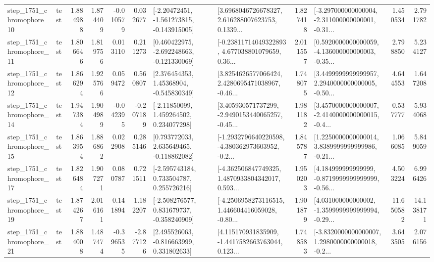 \begin{tabular}{llrrrrllrlrr}
 step\_1751\_chromophore\_10 &      test &      1.884988 &    1.874409 &     -0.010579 &  0.032677 &   [-2.20472451, -1.561273815, -0.143915005] &  [3.6968046726678327, 2.616288007623753, 0.1339... &       1.827418 &  [-3.297000000000004, -2.311000000000001, -0.31... &            1.450534 &          2.791782 \\
 step\_1751\_chromophore\_11 &      test &      1.806646 &    1.819756 &      0.013110 &  0.211273 &   [0.460422975, -2.692248663, -0.121330069] &  [-0.23811714049322893, 4.677038801079659, 0.36... &       2.011557 &  [0.5920000000000059, -4.136000000000003, -0.35... &            2.798850 &          5.234127 \\
 step\_1751\_chromophore\_12 &      test &      1.866294 &    1.925766 &      0.059472 &  0.560807 &     [2.376454353, 1.45368904, -0.545830349] &  [3.8254626577066424, 2.4280695471038967, -0.46... &       1.748075 &  [3.4499999999999957, 2.2940000000000005, -0.50... &            4.644553 &          1.647208 \\
 step\_1751\_chromophore\_14 &      test &      1.947384 &    1.904989 &     -0.042395 & -0.207189 &     [-2.11850099, 1.459264502, 0.234077298] &  [3.405930571737299, -2.9490153440065257, -0.45... &       1.981182 &  [3.4570000000000007, -2.4140000000000015, -0.4... &            0.537777 &          5.934068 \\
 step\_1751\_chromophore\_15 &      test &      1.863954 &    1.886862 &      0.022908 &  0.285146 &    [0.793772033, 2.635649465, -0.118862082] &  [-1.2932796640220598, -4.380362973603952, -0.2... &       1.845787 &  [1.2250000000000014, 3.8389999999999986, -0.21... &            1.066085 &          5.849059 \\
 step\_1751\_chromophore\_17 &      test &      1.826484 &    1.907271 &      0.080787 &  0.721511 &    [-2.595743184, 0.733504787, 0.255726216] &  [-4.362506847749325, 1.4870933804342017, 0.593... &       1.950203 &  [4.184999999999999, -0.8719999999999999, -0.56... &            4.503224 &          6.996426 \\
 step\_1751\_chromophore\_19 &      test &      1.874267 &    2.016161 &      0.141894 &  1.182207 &   [-2.508276577, 0.831679737, -0.358240909] &  [-4.2506958273116515, 1.446604416059028, -0.80... &       1.901879 &  [4.031000000000002, -1.3599999999999994, -0.29... &           11.650582 &         14.138171 \\
 step\_1751\_chromophore\_21 &      test &      1.884008 &    1.487474 &     -0.396535 & -2.877126 &    [2.495526063, -0.816663999, 0.331802633] &  [4.115170931835909, -1.4417582663763044, 0.123... &       1.748583 &  [-3.8320000000000007, 1.2980000000000018, -0.2... &            3.643505 &          2.076156 \\

\end{tabular}
